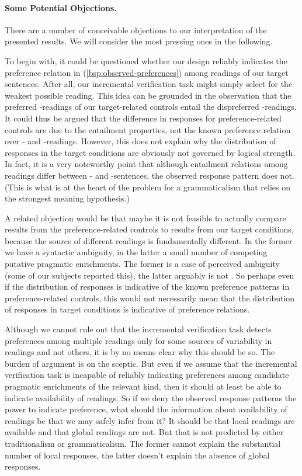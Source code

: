 \documentclass[fleqn,reqno,10pt,draft]{article}
\newcommand{\as}{\acro{as}}
\renewcommand{\es}{\acro{es}}
\newcommand{\lc}{\acro{lc}}
\newcommand{\ec}{\acro{ec}}
\begin{document}
\paragraph{Some Potential Objections.} There are a number of
conceivable objections to our interpretation of the presented
results. We will consider the most pressing ones in the following.

To begin with, it could be questioned whether our design reliably
indicates the preference relation in (\ref{bsp:observed-preferences})
among readings of our target sentences. After all, our incremental
verification task might simply select for the weakest possible
reading. This idea can be grounded in the observation that the
preferred \lc-readings of our target-related controls entail the
dispreferred \ec-readings. It could thus be argued that the difference
in responses for preference-related controls are due to the entailment
properties, not the known preference relation over \lc- and
\ec-readings. However, this does not explain why the distribution of
responses in the target conditions are obviously not governed by
logical strength. In fact, it is a very noteworthy point that although
entailment relations among readings differ between \as- and
\es-sentences, the observed response pattern does not. (This is what
is at the heart of the problem for a grammaticalism that relies on the
strongest meaning hypothesis.)

A related objection would be that maybe it is not feasible to actually
compare results from the preference-related controls to results from
our target conditions, because the source of different readings is
fundamentally different. In the former we have a syntactic ambiguity,
in the latter a small number of competing putative pragmatic
enrichments. The former is a case of perceived ambiguity (some of our
subjects reported this), the latter arguably is not
\citep[see][]{GeurtsPouscoulous2009:Embedded-Implic}. So perhaps even
if the distribution of responses is indicative of the known preference
patterns in preference-related controls, this would not necessarily
mean that the distribution of responses in target conditions is
indicative of preference relations.

Although we cannot rule out that the incremental verification task
detects preferences among multiple readings only for some sources of
variability in readings and not others, it is by no means clear why
this should be so. The burden of argument is on the sceptic. But even
if we assume that the incremental verification task is incapable of
reliably indicating preferences among candidate pragmatic enrichments
of the relevant kind, then it should at least be able to indicate
availability of readings. So if we deny the observed response patterns
the power to indicate preference, what should the information about
availability of readings be that we may safely infer from it? It
should be that local readings are available and that global readings
are not. But that is not predicted by either traditionalism or
grammaticalism. The former cannot explain the substantial number of
local responses, the latter doesn't explain the absence of global
responses.
\end{document}
